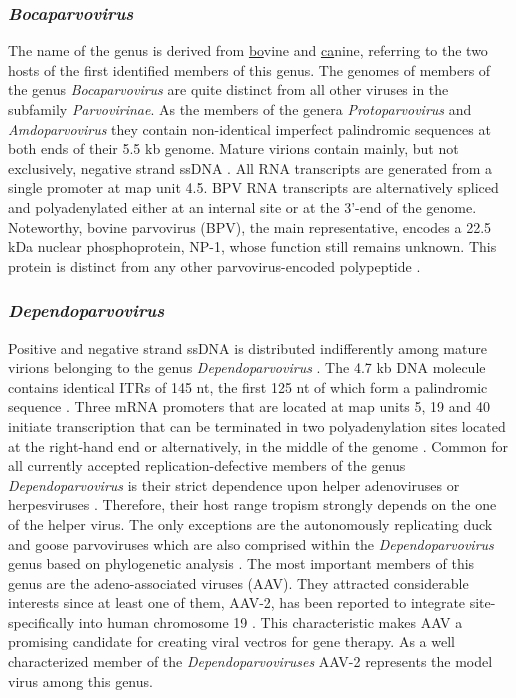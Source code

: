 \subsubsection{\textit{Bocaparvovirus}}
The name of the genus is derived from \underline{bo}vine and \underline{ca}nine, referring to the two hosts of the first identified members of this genus.  The genomes of members of the genus \textit{Bocaparvovirus} are quite distinct from all other viruses in the subfamily \textit{Parvovirinae}. As the members of the genera \textit{Protoparvovirus} and \textit{Amdoparvovirus} they contain non-identical imperfect palindromic sequences at both ends of their 5.5 kb genome. Mature virions contain mainly, but not exclusively, negative strand ssDNA \cite{pmid3783814,pmid12441065}.
All RNA transcripts are generated from a single promoter at map unit 4.5. BPV RNA transcripts are alternatively spliced and polyadenylated either at an internal site or at the 3’-end of the genome. Noteworthy, bovine parvovirus (BPV), the main representative, encodes a 22.5 kDa nuclear phosphoprotein, NP-1, whose function still remains unknown. This protein is distinct from any other parvovirus-encoded polypeptide \cite{pmid6319731}.  


\subsubsection{\textit{Dependoparvovirus}}
Positive and negative strand ssDNA is distributed indifferently among mature virions belonging to the genus \textit{Dependoparvovirus} \cite{pmid5014934, pmid5264145}. The 4.7 kb DNA molecule contains identical ITRs of 145 nt, the first 125 nt of which form a palindromic sequence \cite{pmid6246271}. Three mRNA promoters that are located at map units 5, 19 and 40 initiate transcription that can be terminated in two polyadenylation sites located at the right-hand end or alternatively, in the middle of the genome \cite{pmid6253077, pmid6281463}. Common for all currently accepted replication-defective members of the genus \textit{Dependoparvovirus} is their strict dependence upon helper adenoviruses or herpesviruses \cite{pmid4318977, pmid6270377, pmid5227666}. Therefore, their host range tropism strongly depends on the one of the helper virus. 
The only exceptions are the autonomously replicating duck and goose parvoviruses which are also comprised within the \textit{Dependoparvovirus} genus based on phylogenetic analysis \cite{icvt}. The most important members of this genus are the adeno-associated viruses (AAV). They attracted considerable interests since at least one of them, AAV-2, has been reported to integrate site-specifically into human chromosome 19 \cite{pmid2156265, pmid1653762, pmid1334463, pmid1657596}. This characteristic makes AAV a promising candidate for creating viral vectros for gene therapy. As a well characterized member of the \textit{Dependoparvoviruses} AAV-2 represents the model virus among this genus.  


